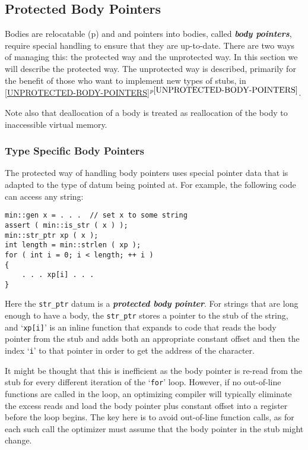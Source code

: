 \documentclass[12pt]{article}
\newcommand{\key}[1]{{\bf \em #1}\index{#1}}
\newcommand{\skey}[2]{{\bf \em #1#2}\index{#1}}
\newcommand{\itemref}[1]{\ref{#1}$^{p\pageref{#1}}$}
\newcommand{\pagref}[1]{p\pageref{#1}}
\newenvironment{indpar}[1][0.3in]%
	{\begin{list}{}%
		     {\setlength{\itemsep}{0in}%
		      \setlength{\topsep}{0in}%
		      \setlength{\parsep}{1ex}%
		      \setlength{\labelwidth}{#1}%
		      \setlength{\leftmargin}{#1}%
		      \addtolength{\leftmargin}{\labelsep}}%
	 \item}%
	{\end{list}}
\begin{document}
\subsection{Protected Body Pointers}
\label{PROTECTED-BODY-POINTERS}

Bodies are relocatable
(\pagref{RELOCATABLE-BODY}) and and pointers into bodies,
called \skey{body pointer}s,
require special handling to
ensure that they are up-to-date.  There are two ways of managing
this: the protected way and the unprotected way.
In this section we will describe the protected way.
The unprotected way is described, primarily for the benefit of those
who want to implement new types of stubs,
in \itemref{UNPROTECTED-BODY-POINTERS}.

Note also that deallocation of a body is treated as
reallocation of the body to inaccessible virtual memory.

\subsubsection{Type Specific Body Pointers}
\label{TYPE-SPECIFIC-BODY-POINTERS}

The protected way of handling body pointers
uses special pointer data that is adapted to
the type of datum being pointed at.  For example, the following
code can access any string:
\begin{indpar}\begin{verbatim}
min::gen x = . . .  // set x to some string
assert ( min::is_str ( x ) );
min::str_ptr xp ( x );
int length = min::strlen ( xp );
for ( int i = 0; i < length; ++ i )
{
    . . . xp[i] . . .
}
\end{verbatim}\end{indpar}

Here the \verb|str_ptr| datum is a \key{protected body pointer}.
For strings that are long enough to have a body, the
\verb|str_ptr| stores a pointer to the stub of the string,
and `\verb|xp[i]|' is an inline function that expands to
code that reads the body pointer from the stub and adds both
an appropriate constant offset and then the index `\verb|i|'
to that pointer in order to get the address of the character.

It might be thought that this is inefficient as the body pointer
is re-read from the stub for every different iteration of the `\verb|for|'
loop.  However, if no out-of-line functions are called in the
loop, an optimizing compiler will typically eliminate
the excess reads and load the body pointer plus constant offset
into a register before the loop begins.  The key here is to
avoid out-of-line function calls, as for each such call the
optimizer must assume that the body pointer in the stub might
change.
\end{document}

